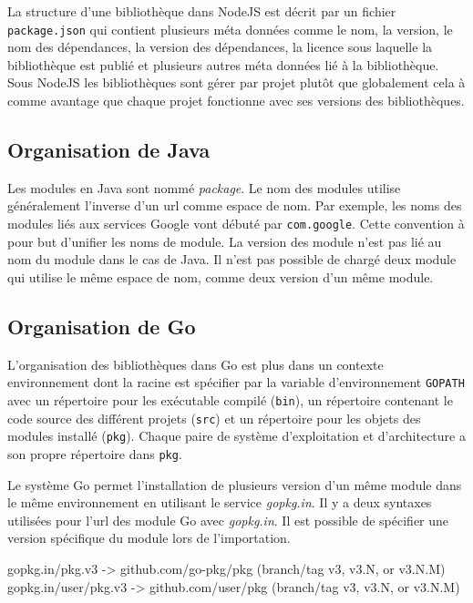 La structure d'une bibliothèque dans NodeJS est décrit par un fichier
\texttt{package.json} qui contient plusieurs méta données comme
le nom, la version, le nom des dépendances, la version des dépendances,
la licence sous laquelle la bibliothèque est publié et plusieurs autres
méta données lié à la bibliothèque. Sous NodeJS les bibliothèques sont gérer
par projet plutôt que globalement cela à comme avantage que chaque projet
fonctionne avec ses versions des bibliothèques.

\subsection{Organisation de Java}
%
Les modules en Java sont nommé \textit{package}.  Le nom des modules utilise
généralement l'inverse d'un url comme espace de nom. Par exemple, les noms des
modules liés aux services Google vont débuté par \texttt{com.google}. Cette
convention à pour but d'unifier les noms de module. La version des module n'est
pas lié au nom du module dans le cas de Java. Il n'est pas possible de chargé
deux module qui utilise le même espace de nom, comme deux version d'un même module.

\subsection{Organisation de Go}
L'organisation des bibliothèques dans Go est plus dans un
contexte environnement dont la racine est spécifier par la variable d'environnement \texttt{GOPATH}
avec un répertoire pour les exécutable compilé (\texttt{bin}),
un répertoire contenant le code source des différent projets (\texttt{src}) et un
répertoire pour les objets des modules installé (\texttt{pkg}). Chaque paire de système
d'exploitation et d'architecture a son propre répertoire dans \texttt{pkg}.

Le système Go permet l'installation de plusieurs version d'un même module dans
le même environnement en utilisant le service \textit{gopkg.in}. Il y a deux
syntaxes utilisées pour l'url des module Go avec \textit{gopkg.in}. Il est possible
de spécifier une version spécifique du module lors de l'importation.

\noindent
\begin{mplisting}{1}
gopkg.in/pkg.v3      -> github.com/go-pkg/pkg (branch/tag v3, v3.N, or v3.N.M)
gopkg.in/user/pkg.v3 -> github.com/user/pkg   (branch/tag v3, v3.N, or v3.N.M)
\end{mplisting}

